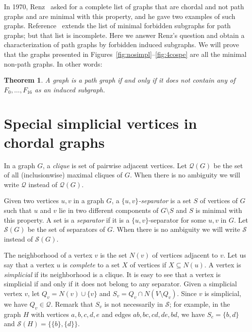 \documentclass[11pt]{article}
\newtheorem{theorem}{Theorem}
\begin{document}
In 1970, Renz~\cite{Ren70} asked for a complete list of graphs that
are chordal and not path graphs and are minimal with this property,
and he gave two examples of such graphs.  Reference~\cite{TonGutSzw05}
extends the list of minimal forbidden subgraphs for path graphs; but
that list is incomplete.  Here we answer Renz's question and obtain a
characterization of path graphs by forbidden induced subgraphs.  We
will prove that the graphs presented in
Figures~\ref{fig:nosimpl}--\ref{fig:4cospe} are all the minimal
non-path graphs.  In other words:
\begin{theorem}
    \label{th:main}
    A graph is a path graph if and only if it does not contain any of
    $F_0, \ldots, F_{16}$ as an induced subgraph.
\end{theorem}



\section{Special simplicial vertices in chordal graphs}

In a graph $G$, a \emph{clique} is set of pairwise adjacent vertices.
Let $\mathcal Q(G)$ be the set of all (inclusionwise) maximal cliques
of $G$.  When there is no ambiguity we will write $\mathcal Q$ instead
of $\mathcal Q(G)$.

Given two vertices $u,v$ in a graph $G$, a \emph{$\{u,v\}$-separator}
is a set $S$ of vertices of $G$ such that $u$ and $v$ lie in two
different components of $G\setminus S$ and $S$ is minimal with this
property.  A set is a \emph{separator} if it is a $\{u,v\}$-separator
for some $u,v$ in $G$.  Let $\mathcal S(G)$ be the set of separators
of $G$.  When there is no ambiguity we will write $\mathcal S$ instead
of $\mathcal S(G)$.

The neighborhood of a vertex $v$ is the set $N(v)$ of vertices
adjacent to $v$.  Let us say that a vertex $u$ is \emph{complete} to a
set $X$ of vertices if $X\subseteq N(u)$.  A vertex is
\emph{simplicial} if its neighborhood is a clique.  It is easy to see
that a vertex is simplicial if and only if it does not belong to any
separator.  Given a simplicial vertex $v$, let $Q_v=N(v)\cup\{v\}$ and
$S_v=Q_v\cap N(V\setminus Q_v)$.  Since $v$ is simplicial, we have
$Q_v\in \mathcal Q$.  Remark that $S_v$ is not necessarily in
$\mathcal S$; for example, in the graph $H$ with vertices $a, b, c, d,
e$ and edges $ab, bc, cd, de, bd$, we have $S_c=\{b, d\}$ and
$\mathcal S(H)=\{\{b\}, \{d\}\}$.
\end{document}
